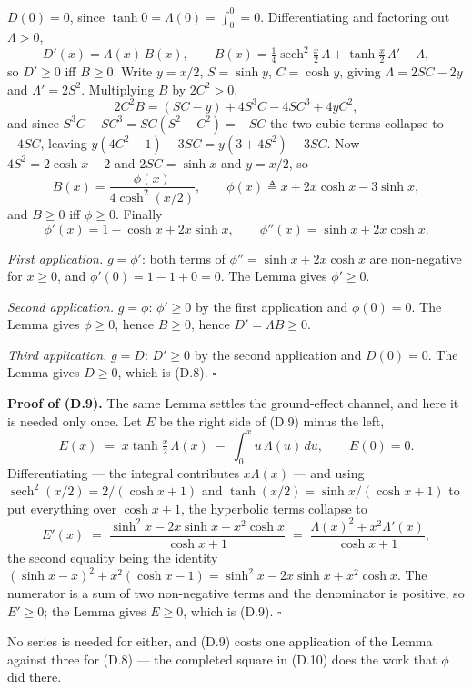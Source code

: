 \documentclass[11pt]{article}
\begin{document}
$D(0) = 0$, since $\tanh0 = \Lambda(0) = \int_0^0 = 0$. Differentiating
and factoring out $\Lambda>0$,
\[
  D'(x) = \Lambda(x)\,B(x),
  \qquad
  B(x) = \tfrac14\operatorname{sech}^2\tfrac{x}{2}\,\Lambda
         + \tanh\tfrac{x}{2}\,\Lambda' - \Lambda ,
\]
so $D'\ge0$ iff $B\ge0$. Write $y = x/2$, $S = \sinh y$, $C = \cosh y$,
giving $\Lambda = 2SC-2y$ and $\Lambda' = 2S^2$. Multiplying $B$ by
$2C^2>0$,
\[
  2C^2B = (SC-y) + 4S^3C - 4SC^3 + 4yC^2 ,
\]
and since $S^3C - SC^3 = SC(S^2-C^2) = -SC$ the two cubic terms
collapse to $-4SC$, leaving $y(4C^2-1) - 3SC = y(3+4S^2) - 3SC$. Now
$4S^2 = 2\cosh x - 2$ and $2SC = \sinh x$ and $y = x/2$, so
\[
  B(x) = \frac{\phi(x)}{4\cosh^2(x/2)},
  \qquad
  \phi(x) \triangleq x + 2x\cosh x - 3\sinh x ,
\]
and $B\ge0$ iff $\phi\ge0$. Finally
\[
  \phi'(x) = 1 - \cosh x + 2x\sinh x,
  \qquad
  \phi''(x) = \sinh x + 2x\cosh x .
\]

\emph{First application.} $g = \phi'$: both terms of
$\phi'' = \sinh x + 2x\cosh x$ are non-negative for $x\ge0$, and
$\phi'(0) = 1-1+0 = 0$. The Lemma gives $\phi'\ge0$.

\emph{Second application.} $g = \phi$: $\phi'\ge0$ by the first
application and $\phi(0) = 0$. The Lemma gives $\phi\ge0$, hence
$B\ge0$, hence $D' = \Lambda B\ge0$.

\emph{Third application.} $g = D$: $D'\ge0$ by the second application
and $D(0) = 0$. The Lemma gives $D\ge0$, which is (D.8). $\square$

\textbf{Proof of (D.9).} The same Lemma settles the ground-effect
channel, and here it is needed only once. Let $E$ be the right side of
(D.9) minus the left,
\[
  E(x) \;=\; x\tanh\tfrac{x}{2}\,\Lambda(x)
             \;-\; \int_0^x\! u\,\Lambda(u)\,du ,
  \qquad E(0) = 0 .
\]
Differentiating --- the integral contributes $x\Lambda(x)$ --- and
using $\operatorname{sech}^2(x/2) = 2/(\cosh x + 1)$ and
$\tanh(x/2) = \sinh x/(\cosh x + 1)$ to put everything over
$\cosh x + 1$, the hyperbolic terms collapse to
\begin{equation}
  E'(x) \;=\; \frac{\sinh^2x - 2x\sinh x + x^2\cosh x}{\cosh x + 1}
        \;=\; \frac{\Lambda(x)^2 + x^2\Lambda'(x)}{\cosh x + 1} ,
  \tag{D.10}
\end{equation}
the second equality being the identity $(\sinh x - x)^2 + x^2(\cosh x
- 1) = \sinh^2x - 2x\sinh x + x^2\cosh x$. The numerator is a sum of
two non-negative terms and the denominator is positive, so $E'\ge0$;
the Lemma gives $E\ge0$, which is (D.9). $\square$

No series is needed for either, and (D.9) costs one application of the
Lemma against three for (D.8) --- the completed square in (D.10) does
the work that $\phi$ did there.
\end{document}
